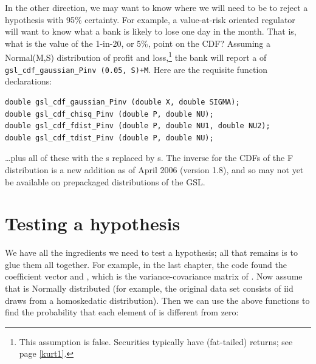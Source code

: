 In the other direction, we may want to know where we will need to be to reject a hypothesis with 95\%
certainty. For example, a value-at-risk oriented regulator will want to know what a bank is likely to lose 
one day in the month. That is, what is the value of the 1-in-20, or 5\%, point on the CDF?
Assuming a Normal(M,S) distribution of profit and loss,\footnote{This assumption is false. Securities
typically have  (fat-tailed) returns; see page \ref{kurt1}.} the bank will report a  of {\tt
gsl\_cdf\_gaussian\_Pinv (0.05, S)+M}. Here are the requisite function declarations:
\begin{lstlisting}
double gsl_cdf_gaussian_Pinv (double X, double SIGMA);
double gsl_cdf_chisq_Pinv (double P, double NU);
double gsl_cdf_fdist_Pinv (double P, double NU1, double NU2);
double gsl_cdf_tdist_Pinv (double P, double NU);
\end{lstlisting}
\dots plus all of these with the s replaced by s.
The inverse for the CDFs of the F distribution is a new addition as of
April 2006 (version 1.8), and so may not yet be available on prepackaged
distributions of the GSL.





\section{Testing a hypothesis}




We have all the ingredients we need to test a hypothesis; all that
remains is to glue them all together. For example, in the last chapter, the code
found the coefficient vector  and , which is the
variance-covariance matrix of .  Now assume that 
is Normally distributed (for example, the original data set consists
of iid draws from a homoskedatic distribution). Then we can use the
above functions to find the probability that each element of 
is different from zero:

